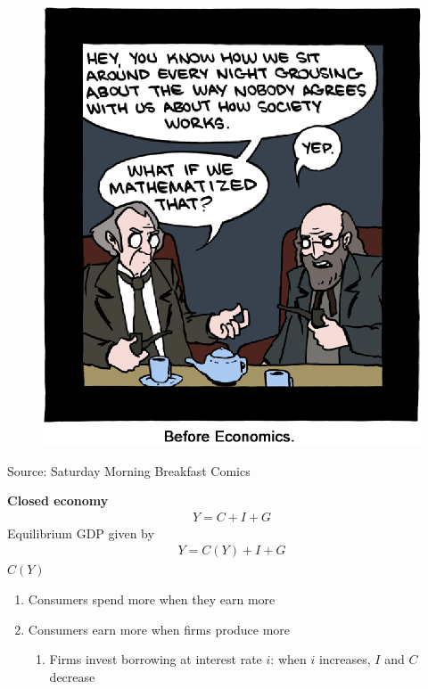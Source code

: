 \documentclass{beamer}
\begin{document}
\begin{frame}
  \begin{figure}
    \includegraphics[scale=.6]{smbc.eps}
  \end{figure}
  Source: Saturday Morning Breakfast Comics
\end{frame}

\begin{frame}
  \textbf{Closed economy}
  \begin{align}
    Y=C+I+G
  \end{align}
  \medskip
  Equilibrium GDP given by
  \begin{align}
    Y=C(Y) + I +G
  \end{align}
  $C(Y)$
  \begin{enumerate}
    \item Consumers spend more when they earn more
    \item Consumers earn more when firms produce more
    \begin{enumerate}
      \item Firms invest borrowing at interest rate $i$: when $i$ increases, $I$ and $C$ decrease   
    \end{enumerate}
  \end{enumerate}
\end{frame}
\end{document}
